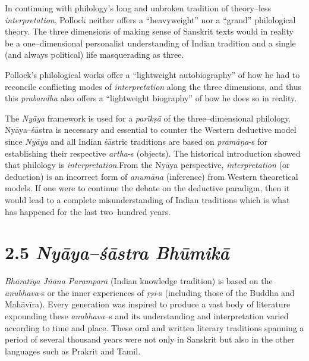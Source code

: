 In continuing with philology’s long and unbroken tradition of theory–less \textit{interpretation}, Pollock neither offers a “heavyweight” nor a “grand” philological theory. The three dimensions of making sense of Sanskrit texts would in reality be a one–dimensional personalist understanding of Indian tradition and a single (and always political) life masquerading as three.

Pollock’s philological works offer a “lightweight autobiography” of how he had to reconcile conflicting modes of \textit{interpretation} along the three dimensions, and thus this \textit{prabandha} also offers a “lightweight biography” of how he does so in reality.

The \textit{Nyāya} framework is used for a \textit{parīkṣā} of the three–dimensional philology. Nyāya–śāstra is necessary and essential to counter the Western deductive model since \textit{Nyāya} and all Indian śāstric traditions are based on \textit{pramāṇa}-s for establishing their respective \textit{artha}-s (objects). The historical introduction showed that philology is \textit{interpretation}.\break From the Nyāya perspective, \textit{interpretation }(or deduction) is an incorrect form of \textit{anumāna} (inference) from Western theoretical models. If one were to continue the debate on the deductive paradigm, then it would lead to a complete misunderstanding of Indian traditions which is what has happened for the last two–hundred years.

\vspace{-.3cm}

\section*{2.5 {\it {\bfseries Nyāya–śāstra Bhūmikā}}}

\vspace{-.2cm}

\textit{Bhāratīya Jñāna Paramparā} (Indian knowledge tradition) is based on the \textit{anubhava}-s or the inner experiences of \textit{ṛṣi}-s (including those of the Buddha and Mahāvīra). Every generation was inspired to produce a vast body of literature expounding these \textit{anubhava}–s and its understanding and interpretation varied according to time and place. These oral and written literary traditions spanning a period of several thousand years were not only in Sanskrit but also in the other languages such as Prakrit and Tamil.

